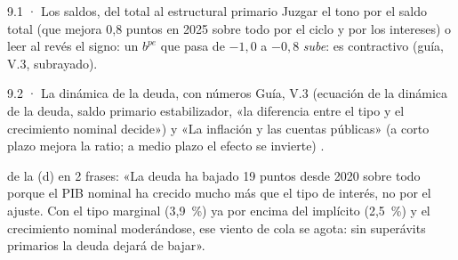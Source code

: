 \begin{complemento}{9.1 · Los saldos, del total al estructural primario}
 Juzgar el tono por el saldo total (que mejora 0,8 puntos en 2025 sobre todo por el ciclo y por los intereses) o leer al revés el signo: un $b^{pe}$ que pasa de $-1{,}0$ a $-0{,}8$ \emph{sube}: es contractivo (guía, V.3, subrayado).
\end{complemento}

\begin{complemento}{9.2 · La dinámica de la deuda, con números}
 Guía, V.3 (ecuación de la dinámica de la deuda, saldo primario estabilizador, «la diferencia entre el tipo y el crecimiento nominal decide») y «La inflación y las cuentas públicas» (a corto plazo mejora la ratio; a medio plazo el efecto se invierte) \parencite{Blanchard2019Deuda}.

 de la (d) en 2 frases: «La deuda ha bajado 19 puntos desde 2020 sobre todo porque el PIB nominal ha crecido mucho más que el tipo de interés, no por el ajuste. Con el tipo marginal (3,9~\%) ya por encima del implícito (2,5~\%) y el crecimiento nominal moderándose, ese viento de cola se agota: sin superávits primarios la deuda dejará de bajar».

\begin{figuracaja}
\caption{España: variación de la deuda pública y sus componentes, 2021-2027}\label{fig:s08}
\end{figuracaja}


\end{complemento}
